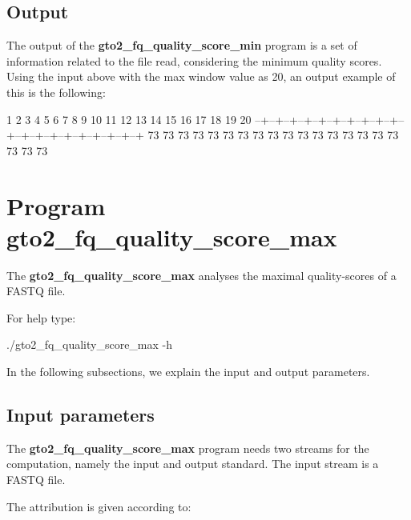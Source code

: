 \documentclass[11pt,]{krantz}
\newenvironment{Shaded}{\begin{snugshade}}{\end{snugshade}}
\newcommand{\ExtensionTok}[1]{#1}
\newcommand{\NormalTok}[1]{#1}
\begin{document}
\subsection*{Output}\label{output-15}


The output of the \textbf{gto2\_fq\_quality\_score\_min} program is a
set of information related to the file read, considering the minimum
quality scores. Using the input above with the max window value as 20,
an output example of this is the following:

\begin{Shaded}
\begin{Highlighting}[]
 \ExtensionTok{1}\NormalTok{  2  3  4  5  6  7  8  9 10 11 12 13 14 15 16 17 18 19 20 }
\ExtensionTok{--+--+--+--+--+--+--+--+--+--+--+--+--+--+--+--+--+--+--+--+}
\ExtensionTok{73}\NormalTok{ 73 73 73 73 73 73 73 73 73 73 73 73 73 73 73 73 73 73 73}
\end{Highlighting}
\end{Shaded}

\section{Program
gto2\_fq\_quality\_score\_max}\label{program-gto2_fq_quality_score_max}

The \textbf{gto2\_fq\_quality\_score\_max} analyses the maximal
quality-scores of a FASTQ file.

For help type:

\begin{Shaded}
\begin{Highlighting}[]
\ExtensionTok{./gto2_fq_quality_score_max}\NormalTok{ -h}
\end{Highlighting}
\end{Shaded}

In the following subsections, we explain the input and output
parameters.

\subsection*{Input parameters}\label{input-parameters-16}


The \textbf{gto2\_fq\_quality\_score\_max} program needs two streams for
the computation, namely the input and output standard. The input stream
is a FASTQ file.

The attribution is given according to:
\end{document}
